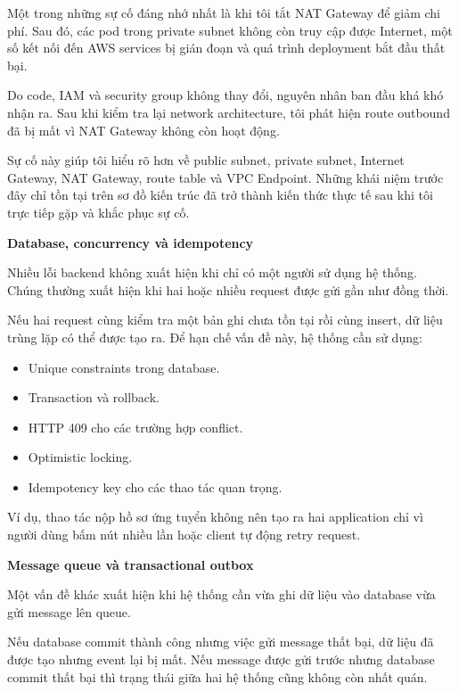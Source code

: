 Một trong những sự cố đáng nhớ nhất là khi tôi tắt NAT Gateway để giảm
chi phí. Sau đó, các pod trong private subnet không còn truy cập được
Internet, một số kết nối đến AWS services bị gián đoạn và quá trình
deployment bắt đầu thất bại.

Do code, IAM và security group không thay đổi, nguyên nhân ban đầu khá
khó nhận ra. Sau khi kiểm tra lại network architecture, tôi phát hiện
route outbound đã bị mất vì NAT Gateway không còn hoạt động.

Sự cố này giúp tôi hiểu rõ hơn về public subnet, private subnet,
Internet Gateway, NAT Gateway, route table và VPC Endpoint. Những khái
niệm trước đây chỉ tồn tại trên sơ đồ kiến trúc đã trở thành kiến thức
thực tế sau khi tôi trực tiếp gặp và khắc phục sự cố.

\vspace{0.5em}\noindent\textbf{Database, concurrency và
idempotency}\par

Nhiều lỗi backend không xuất hiện khi chỉ có một người sử dụng hệ thống.
Chúng thường xuất hiện khi hai hoặc nhiều request được gửi gần như đồng
thời.

Nếu hai request cùng kiểm tra một bản ghi chưa tồn tại rồi cùng insert,
dữ liệu trùng lặp có thể được tạo ra. Để hạn chế vấn đề này, hệ thống
cần sử dụng:

\begin{itemize}
\tightlist
\item
  Unique constraints trong database.
\item
  Transaction và rollback.
\item
  HTTP 409 cho các trường hợp conflict.
\item
  Optimistic locking.
\item
  Idempotency key cho các thao tác quan trọng.
\end{itemize}

Ví dụ, thao tác nộp hồ sơ ứng tuyển không nên tạo ra hai application chỉ
vì người dùng bấm nút nhiều lần hoặc client tự động retry request.

\vspace{0.5em}\noindent\textbf{Message queue và transactional
outbox}\par

Một vấn đề khác xuất hiện khi hệ thống cần vừa ghi dữ liệu vào database
vừa gửi message lên queue.

Nếu database commit thành công nhưng việc gửi message thất bại, dữ liệu
đã được tạo nhưng event lại bị mất. Nếu message được gửi trước nhưng
database commit thất bại thì trạng thái giữa hai hệ thống cũng không còn
nhất quán.

